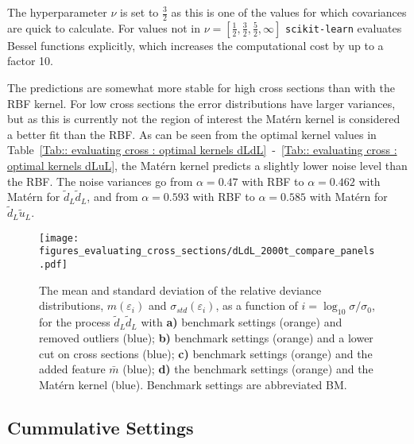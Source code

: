 \documentclass[twoside,english]{uiofysmaster}
\begin{document}
{The hyperparameter $\nu$ is set to $\frac{3}{2}$ as this is one of the values for which covariances are quick to calculate. For values not in $\nu = [\frac{1}{2}, \frac{3}{2}, \frac{5}{2}, \infty]$ \verb|scikit-learn| evaluates Bessel functions explicitly, which increases the computational cost by up to a factor 10. 

The predictions are somewhat more stable for high cross sections than with the RBF kernel. For low cross sections the error distributions have larger variances, but as this is currently not the region of interest the Mat\'{e}rn kernel is considered a better fit than the RBF. As can be seen from the optimal kernel values in Table~\ref{Tab:: evaluating cross : optimal kernels dLdL}~-~\ref{Tab:: evaluating cross : optimal kernels dLuL}, the Mat\'{e}rn kernel predicts a slightly lower noise level than the RBF. The noise variances go from $\alpha = 0.47$ with RBF to $\alpha = 0.462$ with Mat\'{e}rn for $\widetilde{d}_L \widetilde{d}_L$, and from $\alpha = 0.593$ with RBF to $\alpha = 0.585$ with Mat\'{e}rn for $\widetilde{d}_L \widetilde{u}_L$. 

\begin{figure}
\texttt{[image: figures\_evaluating\_cross\_sections/dLdL\_2000t\_compare\_panels.pdf]}
\caption{The mean and standard deviation of the relative deviance distributions, $m(\varepsilon_i)$ and $\sigma_{std}(\varepsilon_i)$, as a function of $i=\log_{10} \sigma/ \sigma_0$, for the process $\widetilde{d}_L \widetilde{d}_L$ with \textbf{a)} benchmark settings (orange) and removed outliers (blue); \textbf{b)} benchmark settings (orange) and a lower cut on cross sections (blue); \textbf{c)} benchmark settings (orange) and the added feature $\bar{m}$ (blue); \textbf{d)} the benchmark settings (orange) and the Mat\'{e}rn kernel (blue). Benchmark settings are abbreviated BM.}
\label{Fig:: evaluating cross : errors BM dLdL}
\end{figure}


\subsection{Cummulative Settings}\label{Sec:: evaluating cross : Optimal Settings}

}
\end{document}
